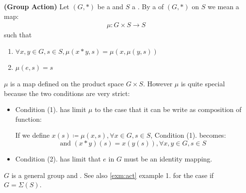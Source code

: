 \documentclass{article}
\newcommand{\bfs}[1]{\textbf{({#1}) }}
\begin{document}
\begin{defa}{\bfs{Group Action}}
   Let $(G, *)$ be a  and $S$ a . By a  of $(G, *)$ on $S$ we mean a map:
\begin{align*}
\mu: G \times S \rightarrow S
\end{align*}
such that
\begin{enumerate}[(1).]
    \item  $\forall x, y \in G, s \in S, \mu(x * y, s)=\mu(x, \mu(y, s))$
    \item $\mu(e, s)=s$
\end{enumerate}
\end{defa}
\begin{rema}
$\mu$ is a map defined on the product space $G \times S$. However $\mu$ is quite special because the two conditions are very strict:
\begin{itemize}
    \item Condition (1). has limit $\mu$ to the case that it can be write as composition of function:
    
    If we define $x(s)\coloneqq\mu(x, s), \forall x \in G, s \in S$, Condition (1). becomes: 
    $$\text{ and  }(x * y)(s)=x(y(s)), \forall x, y \in G, s \in S$$
    \item Condition (2). has limit that $e$ in $G$ must be an identity mapping.
\end{itemize}
\end{rema}

\begin{rema}
$G$ is a general group and . See also \cref{exm:act} example 1. for the case if $G=\Sigma(S)$. 
\end{rema}
\end{document}
